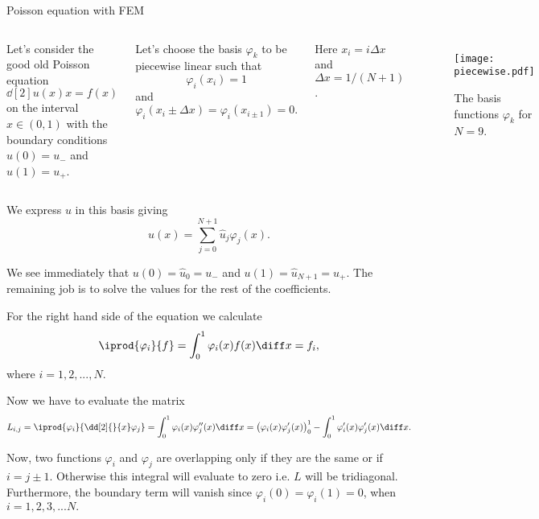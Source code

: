 \begin{frame}{Poisson equation with FEM}
	\begin{columns}[T,onlytextwidth]
	Let's consider the good old Poisson equation
	\[ \dd[2]{u(x)}{x} = f(x) \]
	on the interval $ x \in (0,1) $ with the boundary conditions $ u(0)=u_- $ and $ u(1) = u_+ $. 
	
	\pause
	Let's choose the basis $ \varphi_k $ to be piecewise linear such that 
	\[ \varphi_i(x_i) = 1 \]
	and
	\[ \varphi_i(x_i \pm \Delta x) = \varphi_i(x_{i\pm 1}) = 0. \]
	
	Here $ x_i = i \Delta x $ and $ \Delta x = 1/(N+1) $. 
	
	\begin{figure}
		\centering
		\texttt{[image: piecewise.pdf]}
		\caption{The basis functions $ \varphi_k $ for $ N=9 $.}
	\end{figure}
\end{columns}
\end{frame}

\begin{frame}
	We express $ u $ in this basis giving
	\[ u(x) = \sum_{j=0}^{N+1} \hat{u}_j \varphi_j(x). \]
	
	\pause
	We see immediately that $ u(0) = \hat{u}_0 = u_- $ and $ u(1) = \hat{u}_{N+1} = u_+ $. The remaining job is to solve the values for the rest of the coefficients. 
	
	\pause
	For the right hand side of the equation we calculate
	\[ \iprod{\varphi_i}{f} = \int_{0}^{1} \varphi_i(x) f(x) \diff x = f_i, \]
	where $ i = 1,2,...,N $.
	
	\pause
	Now we have to evaluate the matrix
	\[ L_{i,j} = \iprod{\varphi_i}{\dd[2]{}{x} \varphi_j} = \int_{0}^{1} \varphi_i(x) \varphi_j''(x) \diff x = \left( \varphi_i(x) \varphi_j'(x) \right)_{0}^{1} - \int_{0}^{1} \varphi_i'(x) \varphi_j'(x) \diff x. \]
	
	\pause
	Now, two functions $ \varphi_i $ and $ \varphi_j $ are overlapping only if they are the same or if $ i = j \pm 1 $. Otherwise this integral will evaluate to zero i.e. $ L $ will be tridiagonal. Furthermore, the boundary term will vanish since $ \varphi_i(0) = \varphi_i(1) = 0 $, when $ i= 1,2,3,...N. $
\end{frame}

